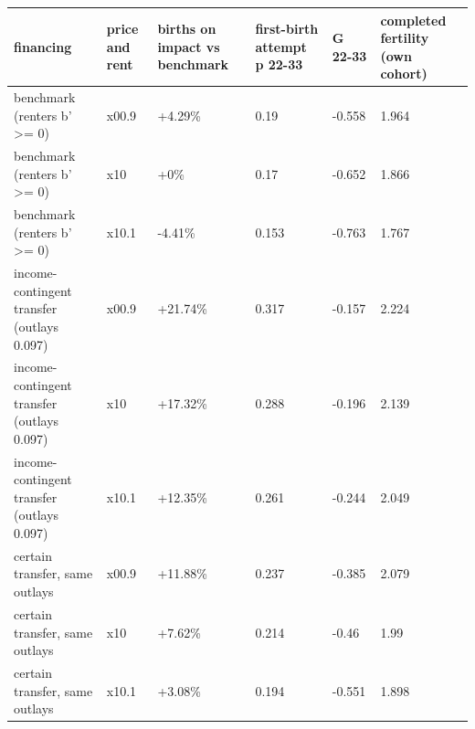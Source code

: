 \begingroup\small
\setlength{\tabcolsep}{3pt}
\renewcommand{\arraystretch}{1.04}
\begin{tabularx}{\linewidth}{XXXXXX}
\toprule
financing & price and rent & births on impact vs benchmark & first-birth attempt p 22-33 & G 22-33 & completed fertility (own cohort) \\
\midrule
benchmark (renters b' \textgreater{}= 0) & x00.9 & +4.29\% & 0.19 & -0.558 & 1.964 \\
benchmark (renters b' \textgreater{}= 0) & x10 & +0\% & 0.17 & -0.652 & 1.866 \\
benchmark (renters b' \textgreater{}= 0) & x10.1 & -4.41\% & 0.153 & -0.763 & 1.767 \\
income-contingent transfer (outlays 0.097) & x00.9 & +21.74\% & 0.317 & -0.157 & 2.224 \\
income-contingent transfer (outlays 0.097) & x10 & +17.32\% & 0.288 & -0.196 & 2.139 \\
income-contingent transfer (outlays 0.097) & x10.1 & +12.35\% & 0.261 & -0.244 & 2.049 \\
certain transfer, same outlays & x00.9 & +11.88\% & 0.237 & -0.385 & 2.079 \\
certain transfer, same outlays & x10 & +7.62\% & 0.214 & -0.46 & 1.99 \\
certain transfer, same outlays & x10.1 & +3.08\% & 0.194 & -0.551 & 1.898 \\
\bottomrule
\end{tabularx}
\endgroup
